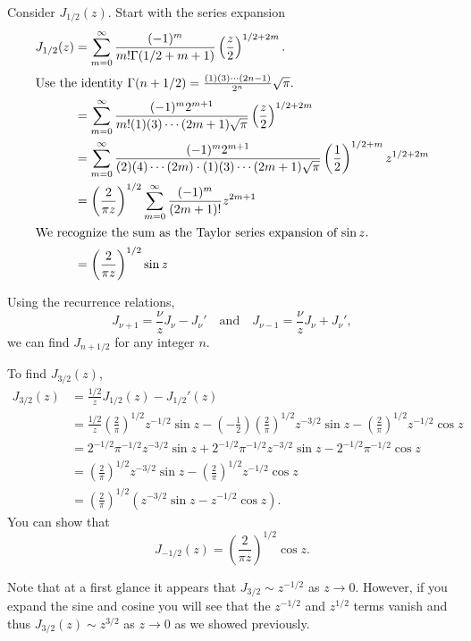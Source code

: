 Consider $J_{1/2}(z)$.  Start with the series expansion
\begin{align*}
  J_{1/2}(z)
  &= \sum_{m = 0}^\infty \frac{(-1)^m}{m! \Gamma(1/2 + m + 1)} \left( \frac{z}{2}
  \right)^{1/2 + 2m}. 
  \\
  \intertext{Use the identity $\Gamma(n+1/2) = \frac{(1)(3)\cdots(2n-1)}{2^n}
    \sqrt{\pi}$.}
  &= \sum_{m = 0}^\infty \frac{(-1)^m 2^{m+1}}{m! (1)(3)\cdots(2m+1) \sqrt{\pi}}
  \left(\frac{z}{2}\right)^{1/2+2m} 
  \\
  &= \sum_{m = 0}^\infty \frac{(-1)^m 2^{m+1}}{(2)(4)\cdots(2m) \cdot (1)(3)\cdots
    (2m+1) \sqrt{\pi}} \left(\frac{1}{2} \right)^{1/2 + m}
  z^{1/2 + 2m} 
  \\
  &= \left( \frac{2}{\pi z} \right)^{1/2} \sum_{m = 0}^\infty \frac{(-1)^m}
  {(2m+1)!} z^{2m+1} 
  \\
  \intertext{We recognize the sum as the Taylor series expansion of $\sin z$.}
  &= \left( \frac{2}{\pi z} \right)^{1/2} \sin z
\end{align*}

Using the recurrence relations,
\[ 
J_{\nu+1} = \frac{\nu}{z} J_\nu - J_\nu' \quad \mathrm{and} \quad
J_{\nu-1} = \frac{\nu}{z} J_\nu + J_\nu', 
\]
we can find $J_{n+1/2}$ for any integer $n$.




\begin{Example}
  To find $J_{3/2}(z)$,
  \begin{align*}
    J_{3/2}(z)
    &= \frac{1/2}{z} J_{1/2}(z) - J_{1/2}'(z) 
    \\
    &= \frac{1/2}{z} \left( \frac{2}{\pi} \right)^{1/2} z^{-1/2} \sin z
    - \left(-\frac{1}{2}\right) \left(\frac{2}{\pi}\right)^{1/2}
    z^{-3/2} \sin z - \left(\frac{2}{\pi}\right)^{1/2} z^{-1/2}
    \cos z 
    \\
    &= 2^{-1/2} \pi^{-1/2} z^{-3/2} \sin z
    + 2^{-1/2} \pi^{-1/2} z^{-3/2} \sin z
    - 2^{-1/2} \pi^{-1/2} \cos z 
    \\
    &= \left(\frac{2}{\pi}\right)^{1/2} z^{-3/2} \sin z
    - \left(\frac{2}{\pi}\right)^{1/2} z^{-1/2} \cos z 
    \\
    &= \left(\frac{2}{\pi}\right)^{1/2} \left( z^{-3/2} \sin z
      - z^{-1/2} \cos z \right).
  \end{align*}
  You can show that 
  \[ 
  J_{-1/2}(z) = \left( \frac{2}{\pi z} \right)^{1/2} \cos z. 
  \]
\end{Example}


Note that at a first glance it appears that $J_{3/2} \sim z^{-1/2}$ as 
$z \to 0$.  However, if you expand the sine and cosine you will see that the
$z^{-1/2}$ and $z^{1/2}$ terms vanish and thus $J_{3/2}(z) \sim z^{3/2}$
as $z \to 0$ as we showed previously.



